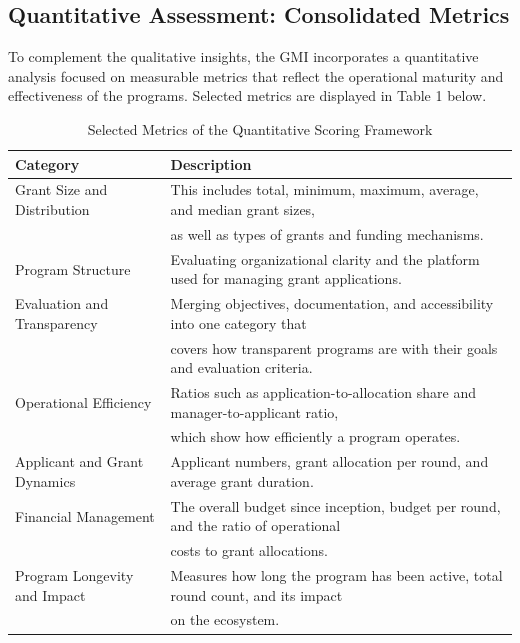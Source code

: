 \documentclass[a4,10pt]{article}
\begin{document}
\subsection{Quantitative Assessment: Consolidated Metrics}\label{sec_5.5}
To complement the qualitative insights, the GMI incorporates a quantitative analysis focused on measurable metrics that reflect the operational maturity and effectiveness of the programs. Selected metrics are displayed in Table 1 below.

\begin{table}[ht!]
\centering
\begin{tabular}{l|l}
\textbf{Category} & \textbf{Description} \\ \hline
Grant Size and Distribution & This includes total, minimum, maximum, average, and median grant sizes, \\
& as well as types of grants and funding mechanisms. \\ \hline
Program Structure & Evaluating organizational clarity and the platform used for managing grant applications. \\ \hline
Evaluation and Transparency & Merging objectives, documentation, and accessibility into one category that \\
& covers how transparent programs are with their goals and evaluation criteria. \\ \hline
Operational Efficiency & Ratios such as application-to-allocation share and manager-to-applicant ratio, \\
& which show how efficiently a program operates. \\ \hline
Applicant and Grant Dynamics & Applicant numbers, grant allocation per round, and average grant duration. \\ \hline
Financial Management & The overall budget since inception, budget per round, and the ratio of operational \\
& costs to grant allocations. \\ \hline
Program Longevity and Impact & Measures how long the program has been active, total round count, and its impact \\
& on the ecosystem. \\
\end{tabular}
\label{Table:1}
\caption{Selected Metrics of the Quantitative Scoring Framework}
\end{table}
\end{document}
